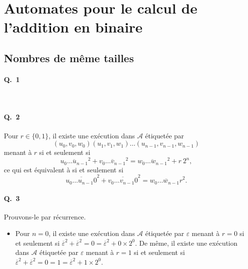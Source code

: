 \section{Automates pour le calcul de l'addition en binaire}
\subsection{Nombres de même tailles}

\paragraph{Q.\ 1}~
\begin{figure}[H]
	\centering
\end{figure}

\paragraph{Q.\ 2}

Pour $r \in \{0,1\}$, il existe une exécution dans $\mathcal{A}$\/ étiquetée par \[
	(u_0,v_0, w_0)(u_1,v_1,w_1)\ldots(u_{n-1},v_{n-1},w_{n-1})
\] menant à $r$\/ si et seulement si \[
	\overline{u_0\ldots u_{n-1}}^2 + \overline{v_0\ldots v_{n-1}}^2 = \overline{w_0\ldots w_{n-1}}^2 + r\:2^{n},
\] ce qui est équivalent à si et seulement si \[
	\overline{u_0\ldots u_{n-1}0}^2 + \overline{v_0\ldots v_{n-1}0}^2 = \overline{w_0\ldots w_{n-1}r}^2
.\]

\paragraph{Q.\ 3}
Prouvons-le par récurrence.
\begin{itemize}
	\item Pour $n = 0$, il existe une exécution dans $\mathcal{A}$\/ étiquetée par $\varepsilon$\/ menant à $r=0$ si et seulement si $\overline{\varepsilon}^2 + \overline{\varepsilon}^2 = 0 = \overline{\varepsilon}^2 + 0 \times 2^0$. De même, il existe une exécution dans $\mathcal{A}$\/ étiquetée par $\varepsilon$\/ menant à $r=1$ si et seulement si $\overline{\varepsilon}^2 + \overline{\varepsilon}^2 = 0 = 1 = \overline{\varepsilon}^2 + 1 \times 2^0$.
\end{itemize}
